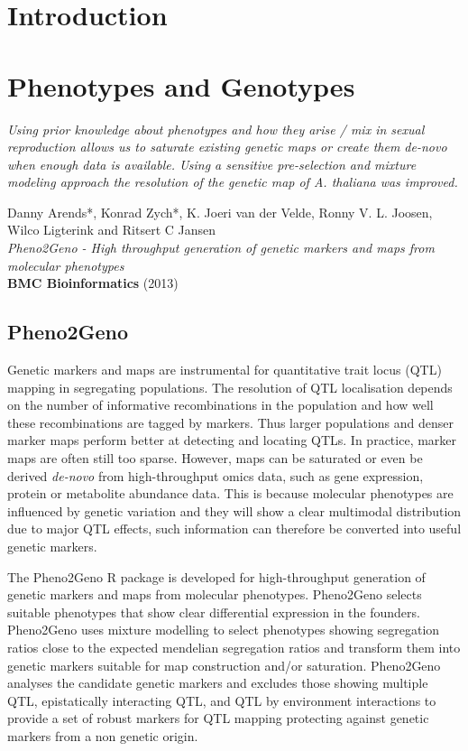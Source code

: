 \documentclass[8pt, twoside, a5paper]{report}
\newenvironment{myexampleblock}[1]{%
    \tcolorbox[beamer,%
    noparskip,breakable,
    colback=LightGreen,colframe=DarkGreen,%
    colbacklower=LimeGreen!75!LightGreen,%
    title=#1]}%
    {\endtcolorbox}
\newcommand{\authors}[1]{\small{#1}}
\newcommand{\bold}[1]{{\bfseries #1}}
\begin{document}
\chapter{Introduction}
\lipsum[1-3]

\chapter{Phenotypes and Genotypes}

\emph{Using prior knowledge about phenotypes and how they arise / mix in sexual reproduction allows us to saturate 
existing genetic maps or create them de-novo when enough data is available. Using a sensitive pre-selection 
and mixture modeling approach the resolution of the genetic map of A. thaliana was improved.}

\null
\vfill

\begin{myexampleblock}{Under review:}
  \authors{Danny Arends*, Konrad Zych*, K. Joeri van der Velde, Ronny V. L. Joosen, Wilco Ligterink and Ritsert C Jansen}\\
  \emph{Pheno2Geno - High throughput generation of genetic markers and maps from molecular phenotypes}\\
  \bold{BMC Bioinformatics} (2013)
\end{myexampleblock}
\newpage

\section{Pheno2Geno}
Genetic markers and maps are instrumental for quantitative trait locus (QTL) mapping in segregating populations. The
resolution of QTL localisation depends on the number of informative recombinations in the population and how well 
these recombinations are tagged by markers. Thus larger populations and denser marker maps perform better at detecting 
and locating QTLs. In practice, marker maps are often still too sparse. However, maps can be saturated or even be derived 
\emph{de-novo} from high-throughput omics data, such as gene expression, protein or metabolite abundance data. This is 
because molecular phenotypes are influenced by genetic variation and they will show a clear multimodal distribution due 
to major QTL effects, such information can therefore be converted into useful genetic markers.

The Pheno2Geno R package is developed for high-throughput generation of genetic markers and maps from molecular 
phenotypes. Pheno2Geno selects suitable phenotypes that show clear differential expression in the founders. 
Pheno2Geno uses mixture modelling to select phenotypes showing segregation ratios close to the expected mendelian segregation 
ratios and transform them into genetic markers suitable for map construction and/or saturation. 
Pheno2Geno analyses the candidate genetic markers and excludes those showing multiple QTL, epistatically interacting QTL, 
and QTL by environment interactions to provide a set of robust markers for QTL mapping protecting against genetic markers 
from a non genetic origin.
\end{document}
